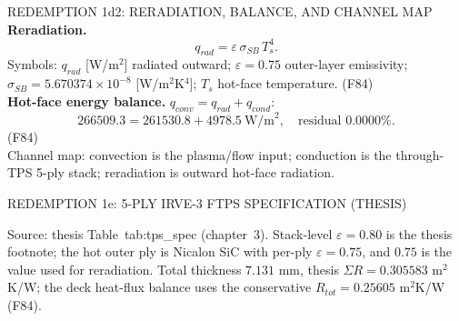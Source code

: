 \documentclass[aspectratio=169,11pt]{beamer}
\begin{document}
\begin{frame}{REDEMPTION 1d2: RERADIATION, BALANCE, AND CHANNEL MAP}
  \small
  \textbf{Reradiation.}
  \[
    q_{rad}=\varepsilon\,\sigma_{SB}\,T_s^4.
  \]
  Symbols: $q_{rad}$ [W/m$^2$] radiated outward; $\varepsilon=0.75$ outer-layer emissivity;
  $\sigma_{SB}=5.670374\times10^{-8}$ [W/m$^2$K$^4$]; $T_s$ hot-face
  temperature. (F84) \\

  \textbf{Hot-face energy balance.} $q_{conv}=q_{rad}+q_{cond}$:
  \[
    266509.3=261530.8+4978.5\ \text{W/m}^2,\quad
    \text{residual }0.0000\%.
  \]
  (F84) \\

  Channel map: convection is the plasma/flow input; conduction is the
  through-TPS 5-ply stack; reradiation is outward hot-face radiation.
\end{frame}


\begin{frame}{REDEMPTION 1e: 5-PLY IRVE-3 FTPS SPECIFICATION (THESIS)}
  \scriptsize
  \par\vspace{0.25cm}
  \par{\footnotesize Source: thesis Table~tab:tps\_spec (chapter~3). Stack-level
  $\varepsilon=0.80$ is the thesis footnote; the hot outer ply is Nicalon SiC with
  per-ply $\varepsilon=0.75$, and $0.75$ is the value used for reradiation.
  Total thickness $7.131$ mm, thesis $\Sigma R=0.305583$ m$^2$K/W;
  the deck heat-flux balance uses the conservative $R_{tot}=0.25605$ m$^2$K/W (F84).}
\end{frame}
\end{document}
